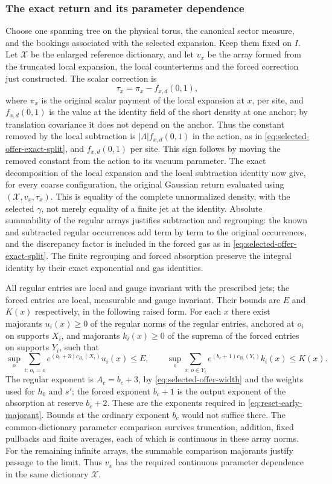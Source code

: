 \subsubsection{The exact return and its parameter dependence}
Choose one spanning tree on the physical torus, the canonical sector
measure, and the bookings associated with the selected expansion.
Keep them fixed on $I$. Let $\mathcal X$ be the enlarged reference
dictionary, and let $v_x$ be the array formed from the truncated local
expansion, the local counterterms and the forced correction just
constructed. The scalar correction is
\[
 \tau_x=\pi_x-f_{x,d}(0,1),
\]
where $\pi_x$ is the original scalar payment of the local expansion
at $x$, per site, and $f_{x,d}(0,1)$ is the value at the identity
field of the short density at one anchor; by translation covariance
it does not depend on the anchor. Thus the constant removed by the
local subtraction is $|\Lambda|f_{x,d}(0,1)$ in the action, as in
\eqref{eq:selected-offer-exact-split}, and $f_{x,d}(0,1)$ per site.
This sign follows by moving the removed constant from the action to
its vacuum parameter. The exact decomposition of the local expansion
and the local subtraction identity now give, for every coarse
configuration, the original Gaussian return evaluated using
$(\mathcal X,v_x,\tau_x)$. This is equality of the complete
unnormalized density, with the selected $\gamma$, not merely equality
of a finite jet at the identity. Absolute summability of the regular
arrays justifies subtraction and regrouping: the known and subtracted
regular occurrences add term by term to the original occurrences, and
the discrepancy factor is included in the forced gas as in
\eqref{eq:selected-offer-exact-split}. The finite regrouping and
forced absorption preserve the integral identity by their exact
exponential and gas identities.

All regular entries are local and gauge invariant with the prescribed
jets; the forced entries are local, measurable and gauge invariant.
Their bounds are $E$ and $K(x)$ respectively, in the following
raised form. For each $x$ there exist majorants $u_i(x)\ge0$ of the
regular norms of the regular entries, anchored at $o_i$ on supports
$X_i$, and majorants $k_i(x)\ge0$ of the suprema of the forced
entries on supports $Y_i$, such that
\begin{equation}\label{eq:selected-offer-budgets}
 \sup_o\sum_{i:\,o_i=o}e^{(b_c+3)c_{B_c}(X_i)}u_i(x)\le E,
 \qquad
 \sup_o\sum_{i:\,o\in Y_i}e^{(b_c+1)c_{B_c}(Y_i)}k_i(x)\le K(x).
\end{equation}
The regular exponent is $A_c=b_c+3$, by
\eqref{eq:selected-offer-width} and the weights used for
$h_0$ and $s'$; the forced exponent $b_c+1$ is the output exponent
of the absorption at reserve $b_c+2$. These are the exponents
required in \eqref{eq:reset-early-majorant}. Bounds at the ordinary
exponent $b_c$ would not suffice there. The common-dictionary
parameter comparison survives truncation, addition, fixed pullbacks and
finite averages, each of which is continuous in these array norms.
For the remaining infinite arrays, the summable comparison majorants
justify passage to the limit. Thus $v_x$ has the required continuous
parameter dependence in the same dictionary $\mathcal X$.

